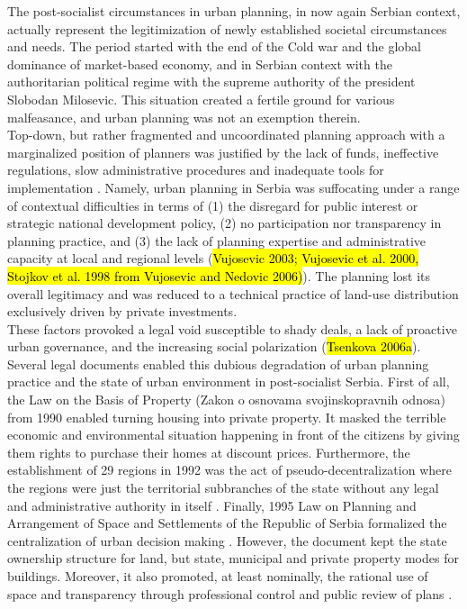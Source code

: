 \documentclass[11pt]{report}
\begin{document}
The post-socialist circumstances in urban planning, in now again Serbian context, actually represent the legitimization of newly established societal circumstances and needs.
The period started with the end of the Cold war and the global dominance of market-based economy, and in Serbian context with the authoritarian political regime with the supreme authority of the president Slobodan Milosevic. This  situation  created a fertile  ground  for various malfeasance, and urban planning was not an exemption therein.
\\
Top-down, but rather fragmented and uncoordinated planning approach with a marginalized position of planners was justified by the lack of funds, 
ineffective regulations, slow administrative procedures and inadequate tools for implementation \cite{ref Peric 2016}.
Namely, urban planning in Serbia was suffocating under a range of contextual difficulties in terms of  (1) the disregard for public interest or strategic national development policy, (2) no participation nor transparency in planning practice, and (3) the lack of planning expertise and administrative capacity at local and regional levels (\hl{Vujosevic  2003;  Vujosevic et  al. 2000, Stojkov et al. 1998 from Vujosevic and Nedovic 2006)}).
The planning lost its overall legitimacy and was reduced to a technical practice of land-use distribution exclusively driven by private investments. 
\\
These factors provoked a legal void susceptible to shady deals, a lack of proactive urban governance, and the increasing social polarization (\hl{Tsenkova 2006a}). 
Several legal documents enabled this dubious degradation of urban planning practice and the state of urban environment in post-socialist Serbia.
First of all, the Law on the Basis of Property (Zakon o osnovama svojinskopravnih odnosa) from 1990 enabled turning housing into private property. It masked the terrible economic and environmental situation happening in front of the citizens by giving them rights to purchase their homes at discount prices. 
Furthermore, the establishment of 29 regions in 1992 was the act of pseudo-decentralization where the regions were just the territorial subbranches of the state without any legal and administrative authority in itself \cite{Vujosevic 2015 Regionalizam u Srbiji 2}.
Finally, 1995 Law on Planning and Arrangement of Space and Settlements of the Republic of Serbia formalized the centralization of urban decision making \cite{Mornings after Nedovic Budic}. However, the document kept the state ownership structure for land, but state, municipal and private property modes for buildings. Moreover, it also promoted, at least nominally, the rational use of space and transparency through professional control and public review of plans \cite{adjustment of planning practice nedovic budic 2001}.
\end{document}
